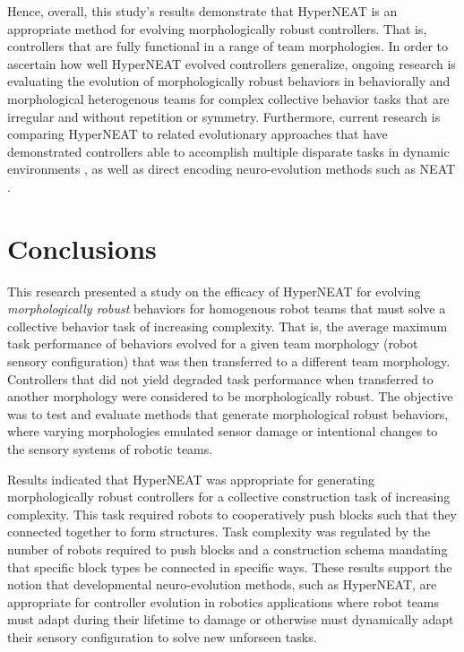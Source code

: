 \documentclass[conference]{IEEEtran}
\begin{document}
Hence, overall, this study's results demonstrate that HyperNEAT is an appropriate method for evolving
morphologically robust controllers.  That is, controllers that are fully functional in a range of team morphologies.
In order to ascertain how well HyperNEAT evolved controllers generalize, ongoing research is evaluating
the evolution of morphologically robust behaviors in behaviorally and morphological heterogenous teams
for complex collective behavior tasks that are irregular and without repetition or symmetry.
Furthermore, current research is comparing HyperNEAT to related evolutionary approaches that have demonstrated
controllers able to accomplish multiple disparate tasks in dynamic environments
\cite{IzquierdoTorres2008}, as well as direct encoding neuro-evolution methods such as NEAT \cite{StanleyMiikkulainen2002}.

\section{Conclusions}

This research presented a study on the efficacy of HyperNEAT for evolving \textit{morphologically robust}
behaviors for homogenous robot teams that must solve a collective behavior task of increasing complexity.
That is, the average maximum task performance of behaviors evolved for a given team morphology (robot
sensory configuration) that was then transferred to a different team morphology.
Controllers that did not yield degraded task performance when transferred to another morphology
were considered to be morphologically robust.
The objective was to test and evaluate methods that generate morphological robust behaviors,
where varying morphologies emulated sensor damage or intentional changes to the sensory systems
of robotic teams.

Results indicated that HyperNEAT was appropriate for generating morphologically robust
controllers for a collective construction task of increasing complexity.
This task required robots to cooperatively push blocks such
that they connected together to form structures.
Task complexity was regulated by
the number of robots required to push blocks and a construction schema mandating that specific block types
be connected in specific ways.
These results support the notion that developmental neuro-evolution methods, such as HyperNEAT,
are appropriate for controller evolution in robotics applications where robot teams
must adapt during their lifetime to damage or otherwise must dynamically
adapt their sensory configuration to solve new unforseen tasks.



%
\end{document}
